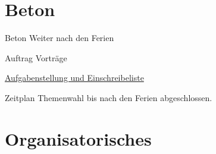 








\section{Beton}
\BlueSectionSlide
\begin{frame}{Beton}
    Weiter nach den Ferien
\end{frame}


\begin{frame}{Auftrag Vorträge}

    \href{https://schweizerischebau.sharepoint.com/:w:/s/HTg-26/EaaGwb0IsNRJs_4ioWjo2QYBQBWk2LP46a-3XFjpo9Mc1g?e=F0TkXK}{Aufgabenstellung und Einschreibeliste}

\end{frame}


\begin{frame}{Zeitplan}
    Themenwahl bis nach den Ferien abgeschlossen.
\end{frame}


\section{Organisatorisches}
\BlueSectionSlide


